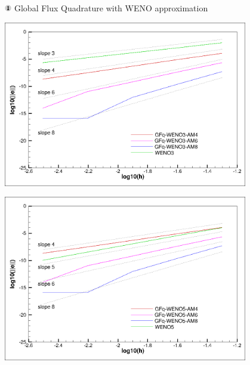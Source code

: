 \begin{frame}[t]{\includegraphics[width=0.3cm]{circle1} Global Flux Quadrature  with WENO approximation}
{\begin{minipage}{0.5\textwidth}
\centering\includegraphics[width=0.8\textwidth]{../figs/WENO-FD/figures/Burgers/convergence_steady/convburg-weno3} 
\end{minipage}\hfill
\begin{minipage}{0.5\textwidth}
\centering\includegraphics[width=0.8\textwidth]{../figs/WENO-FD/figures/Burgers/convergence_steady/convburg-weno5}
\end{minipage}
} 

\end{frame}
